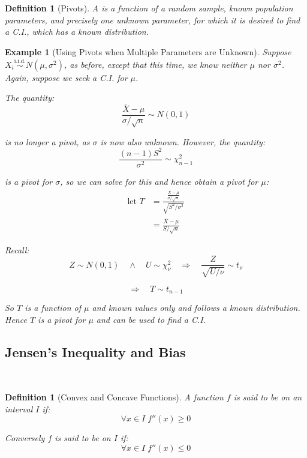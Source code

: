 \documentclass[12pt,a4paper]{article}
\newtheorem{defn}[thm]{Definition}
\newtheorem{ex}[thm]{Example}
\newcommand{\uline}[1]{\underline{\smash{#1}}}
\begin{document}
\begin{defn}[Pivots]\vspace{1cm}

A \uline{pivot} is a function of a random sample, known population parameters, and precisely one unknown parameter, for which it is desired to find a C.I., which has a known distribution.

\end{defn}

\begin{ex}[Using Pivots when Multiple Parameters are Unknown]\vspace{1cm}

Suppose $X_i \overset{\text{i.i.d.}}{\sim} N(\mu,\sigma^2)$, as before, except that this time, we know neither $\mu$ nor $\sigma^2$. Again, suppose we seek a C.I. for $\mu$.

The quantity:
$$\frac{\bar{X}-\mu}{\sigma/\sqrt{n}} \sim N(0,1)$$

is no longer a pivot, as $\sigma$ is now also unknown. However, the quantity:
$$\frac{(n-1)S^2}{\sigma^2} \sim \chi^2_{n-1}$$

is a pivot for $\sigma$, so we can solve for this and hence obtain a pivot for $\mu$:
\begin{align*}
\text{let } T &= \frac{\frac{\bar{X}-\mu}{\sigma/\sqrt{n}}}{\sqrt{S^2/\sigma^2}}\\
&= \frac{\bar{X}-\mu}{S/\sqrt{n}}
\end{align*}

Recall:
$$Z\sim N(0,1) \quad \wedge\quad U \sim \chi^2_\nu \quad \Rightarrow\quad \frac{Z}{\sqrt{U/\nu}} \sim t_\nu$$

$$\Rightarrow\quad T \sim t_{n-1}$$

So $T$ is a function of $\mu$ and known values only and follows a known distribution. Hence $T$ is a pivot for $\mu$ and can be used to find a C.I.

\end{ex}

\subsection{Jensen's Inequality and Bias}$\;$

\begin{defn}[Convex and Concave Functions]\vspace{1cm}

A function $f$ is said to be \uline{convex} on an interval $I$ if:
$$\forall x\in I\;f''(x) \geq 0$$\par\vspace{1cm}

Conversely $f$ is said to be \uline{concave} on $I$ if:
$$\forall x \in I \; f''(x) \leq 0$$\par\vspace{1cm}

\end{defn}
\end{document}
